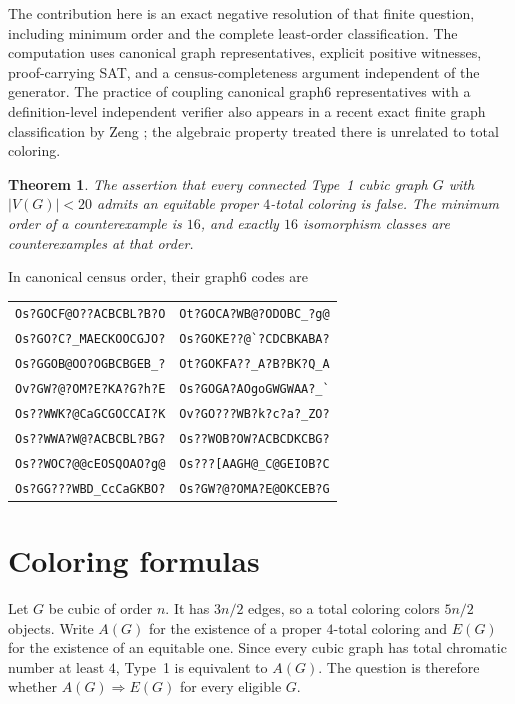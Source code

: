\documentclass[11pt]{article}
\newtheorem{theorem}{Theorem}
\begin{document}
The contribution here is an exact negative resolution of that finite
question, including minimum order and the complete least-order
classification.  The computation uses canonical graph representatives,
explicit positive witnesses, proof-carrying SAT, and a census-completeness
argument independent of the generator.  The practice of coupling
canonical graph6 representatives with a definition-level independent
verifier also appears in a recent exact finite graph classification by
Zeng \cite{Zeng2026Whiskered}; the algebraic property treated there is
unrelated to total coloring.

\begin{theorem}\label{thm:main}
The assertion that every connected Type~1 cubic graph \(G\) with
\(|V(G)|<20\) admits an equitable proper \(4\)-total coloring is false.
The minimum order of a counterexample is \(16\), and exactly \(16\)
isomorphism classes are counterexamples at that order.
\end{theorem}

In canonical census order, their graph6 codes are
\begin{center}
\small
\begin{tabular}{ll}
\verb|Os?GOCF@O??ACBCBL?B?O| & \verb|Ot?GOCA?WB@?ODOBC_?g@|\\
\verb|Os?GO?C?_MAECKOOCGJO?| & \verb|Os?GOKE??@`?CDCBKABA?|\\
\verb|Os?GGOB@OO?OGBCBGEB_?| & \verb|Ot?GOKFA??_A?B?BK?Q_A|\\
\verb|Ov?GW?@?OM?E?KA?G?h?E| & \verb|Os?GOGA?AOgoGWGWAA?_`|\\
\verb|Os??WWK?@CaGCGOCCAI?K| & \verb|Ov?GO???WB?k?c?a?_ZO?|\\
\verb|Os??WWA?W@?ACBCBL?BG?| & \verb|Os??WOB?OW?ACBCDKCBG?|\\
\verb|Os??WOC?@@cEOSQOAO?g@| & \verb|Os???[AAGH@_C@GEIOB?C|\\
\verb|Os?GG???WBD_CcCaGKBO?| & \verb|Os?GW?@?OMA?E@OKCEB?G|\\
\end{tabular}
\end{center}

\section{Coloring formulas}

Let \(G\) be cubic of order \(n\).  It has \(3n/2\) edges, so a total
coloring colors \(5n/2\) objects.  Write \(A(G)\) for the existence of a
proper \(4\)-total coloring and \(E(G)\) for the existence of an equitable
one.  Since every cubic graph has total chromatic number at least \(4\),
Type~1 is equivalent to \(A(G)\).  The question is therefore whether
\(A(G)\Rightarrow E(G)\) for every eligible \(G\).
\end{document}
